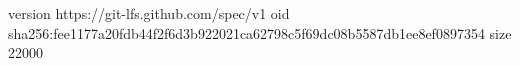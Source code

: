version https://git-lfs.github.com/spec/v1
oid sha256:fee1177a20fdb44f2f6d3b922021ca62798c5f69dc08b5587db1ee8ef0897354
size 22000
